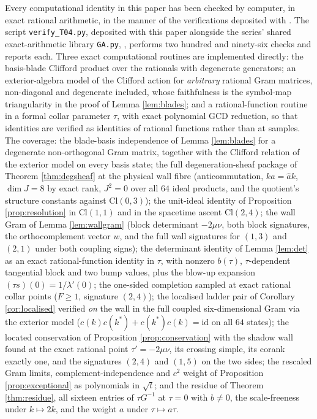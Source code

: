 \documentclass[11pt]{article}
\theoremstyle{definition}
\newcommand{\Cl}{\mathrm{Cl}}
\begin{document}
Every computational identity in this paper has been checked by computer, in exact rational arithmetic, in the manner of the verifications deposited with \cite{ButlerT1}. The script \texttt{verify\_T04.py}, deposited with this paper alongside the series' shared exact-arithmetic library \texttt{GA.py}, \cite{ButlerVerifyT04}, performs two hundred and ninety-six checks and reports each. Three exact computational routines are implemented directly: the basis-blade Clifford product over the rationals with degenerate generators; an exterior-algebra model of the Clifford action for \emph{arbitrary} rational Gram matrices, non-diagonal and degenerate included, whose faithfulness is the symbol-map triangularity in the proof of Lemma \ref{lem:blades}; and a rational-function routine in a formal collar parameter $\tau$, with exact polynomial GCD reduction, so that identities are verified as identities of rational functions rather than at samples. The coverage: the blade-basis independence of Lemma \ref{lem:blades} for a degenerate non-orthogonal Gram matrix, together with the Clifford relation of the exterior model on every basis state; the full degeneration-sheaf package of Theorem \ref{thm:degsheaf} at the physical wall fibre (anticommutation, $ka = \hat a k$, $\dim J = 8$ by exact rank, $J^2 = 0$ over all $64$ ideal products, and the quotient's structure constants against $\Cl(0,3)$); the unit-ideal identity of Proposition \ref{prop:resolution} in $\Cl(1,1)$ and in the spacetime ascent $\Cl(2,4)$; the wall Gram of Lemma \ref{lem:wallgram} (block determinant $-2\mu\nu$, both block signatures, the orthocomplement vector $w$, and the full wall signatures for $(1,3)$ and $(2,1)$ under both coupling signs); the determinant identity of Lemma \ref{lem:det} as an exact rational-function identity in $\tau$, with nonzero $b(\tau)$, $\tau$-dependent tangential block and two bump values, plus the blow-up expansion $(\tau s)(0) = 1/\lambda'(0)$; the one-sided completion sampled at exact rational collar points ($F \geq 1$, signature $(2,4)$); the localised ladder pair of Corollary \ref{cor:localised} verified \emph{on} the wall in the full coupled six-dimensional Gram via the exterior model ($c(k)c(k^*) + c(k^*)c(k) = \mathrm{id}$ on all $64$ states); the located conservation of Proposition \ref{prop:conservation} with the shadow wall found at the exact rational point $\tau' = -2\mu\nu$, its crossing simple, its corank exactly one, and the signatures $(2,4)$ and $(1,5)$ on the two sides; the rescaled Gram limits, complement-independence and $c^2$ weight of Proposition \ref{prop:exceptional} as polynomials in $\sqrt t$; and the residue of Theorem \ref{thm:residue}, all sixteen entries of $\tau G^{-1}$ at $\tau = 0$ with $b \neq 0$, the scale-freeness under $k \mapsto 2k$, and the weight $a$ under $\tau \mapsto a\tau$.
\end{document}
